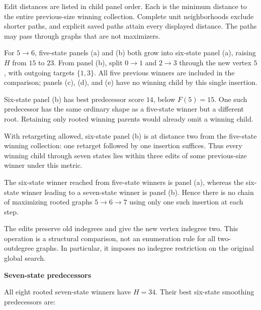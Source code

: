 \documentclass[10pt,a4paper]{article}
\begin{document}
Edit distances are listed in child panel order. Each is the minimum distance to the entire previous-size winning collection. Complete unit neighborhoods exclude shorter paths, and explicit saved paths attain every displayed distance. The paths may pass through graphs that are not maximizers.\par\vspace{2mm}
For $5\to6$, five-state panels (a) and (b) both grow into six-state panel (a), raising $H$ from $15$ to $23$. From panel (b), split $0\to1$ and $2\to3$ through the new vertex $5$, with outgoing targets $\{1,3\}$. All five previous winners are included in the comparison; panels (c), (d), and (e) have no winning child by this single insertion.\par\vspace{2mm}
Six-state panel (b) has best predecessor score $14$, below $F(5)=15$. One such predecessor has the same ordinary shape as a five-state winner but a different root. Retaining only rooted winning parents would already omit a winning child.\par\vspace{2mm}
With retargeting allowed, six-state panel (b) is at distance two from the five-state winning collection: one retarget followed by one insertion suffices. Thus every winning child through seven states lies within three edits of some previous-size winner under this metric.\par\vspace{2mm}
The six-state winner reached from five-state winners is panel (a), whereas the six-state winner leading to a seven-state winner is panel (b). Hence there is no chain of maximizing rooted graphs $5\to6\to7$ using only one such insertion at each step.\par\vspace{2mm}
The edits preserve old indegrees and give the new vertex indegree two. This operation is a structural comparison, not an enumeration rule for all two-outdegree graphs. In particular, it imposes no indegree restriction on the original global search.\par
\clearpage
{\Large\bfseries Seven-state predecessors}\par\vspace{4mm}
All eight rooted seven-state winners have $H=34$. Their best six-state smoothing predecessors are:\par\vspace{3mm}
\end{document}
